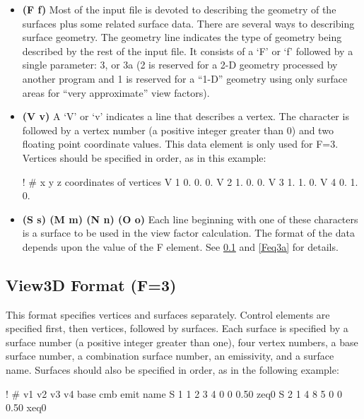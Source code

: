 \documentclass[10pt]{article}
\begin{document}
\begin{itemize}
\item\textbf{(F f)} Most of the input file is devoted to describing the
geometry of the surfaces plus some related surface data.  There are several
ways to describing surface geometry. The geometry line indicates the type of
geometry being described by the rest of the input file. It consists of a `F'
or `f' followed by a single parameter: 3, or 3a (2 is reserved for a 2-D
geometry processed by another program and 1 is reserved for a ``1-D'' geometry
using only surface areas for “very approximate” view factors).


\item\textbf{(V v)} A `V' or `v' indicates a line that describes a vertex.  The
character is followed by a vertex number (a positive integer greater than 0)
and two floating point coordinate values.  This data element is only used for
F=3.  Vertices should be specified in order, as in this example:

\begin{vs3file}
!  #   x    y    z      coordinates of vertices
V  1   0.   0.   0.
V  2   1.   0.   0.
V  3   1.   1.   0.
V  4   0.   1.   0.
\end{vs3file}

\item\textbf{(S s) (M m) (N n) (O o)} Each line beginning with one of these
characters is a surface to be used in the view factor calculation.  The format
of the data depends upon the value of the F element.  See \ref{Feq3} and 
\ref{Feq3a} for details.
\end{itemize}

\subsection{View3D Format (F=3)}\label{Feq3}
This format specifies vertices and surfaces separately.  Control elements are
specified first, then vertices, followed by surfaces.  Each surface is
specified by a surface number (a positive integer greater than one), four
vertex numbers, a base surface number, a combination surface number, an
emissivity, and a surface name.  Surfaces should also be specified in order,
as in the following example:

\begin{vs3file}
!  #   v1  v2  v3  v4 base cmb  emit  name
S  1    1   2   3   4   0   0   0.50  zeq0
S  2    1   4   8   5   0   0   0.50  xeq0
\end{vs3file}
\end{document}
